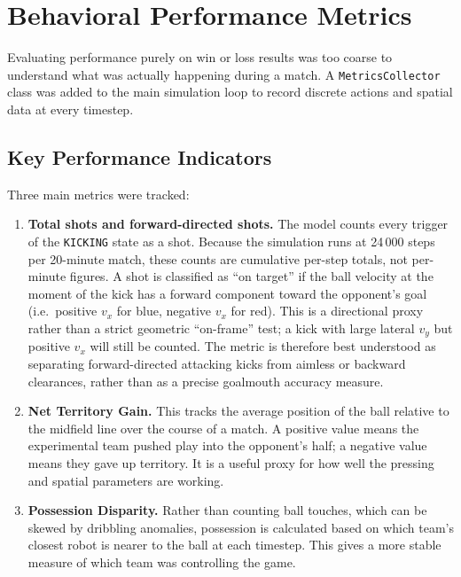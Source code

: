 \documentclass[12pt, a4paper]{report}
\begin{document}
\section{Behavioral Performance Metrics}

Evaluating performance purely on win or loss results was too coarse to
understand what was actually happening during a match.
A \texttt{MetricsCollector} class was added to the main simulation loop to
record discrete actions and spatial data at every timestep.

\subsection{Key Performance Indicators}

Three main metrics were tracked:

\begin{enumerate}
  \item \textbf{Total shots and forward-directed shots.}
    The model counts every trigger of the \texttt{KICKING} state as a shot.
    Because the simulation runs at 24\,000 steps per 20-minute match, these
    counts are cumulative per-step totals, not per-minute figures.
    A shot is classified as ``on target'' if the ball velocity at the
    moment of the kick has a forward component toward the opponent's goal
    (i.e.\ positive $v_x$ for blue, negative $v_x$ for red).
    This is a directional proxy rather than a strict geometric
    ``on-frame'' test; a kick with large lateral $v_y$ but positive $v_x$
    will still be counted.
    The metric is therefore best understood as separating forward-directed
    attacking kicks from aimless or backward clearances, rather than as a
    precise goalmouth accuracy measure.

  \item \textbf{Net Territory Gain.}
    This tracks the average position of the ball relative to the midfield
    line over the course of a match.
    A positive value means the experimental team pushed play into the
    opponent's half; a negative value means they gave up territory.
    It is a useful proxy for how well the pressing and spatial parameters
    are working.

  \item \textbf{Possession Disparity.}
    Rather than counting ball touches, which can be skewed by dribbling
    anomalies, possession is calculated based on which team's closest robot
    is nearer to the ball at each timestep.
    This gives a more stable measure of which team was controlling the game.
\end{enumerate}
\end{document}
